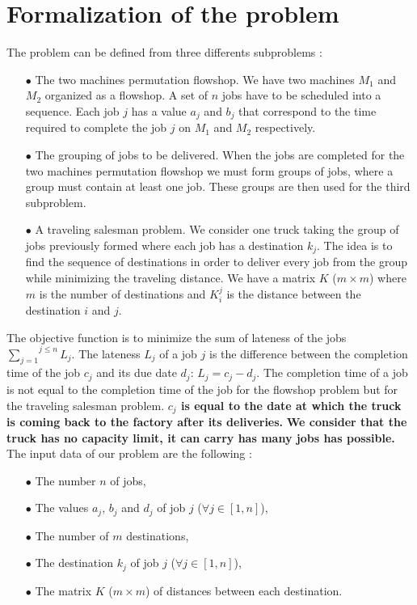 \documentclass[UTF8, twoside]{EPURapport}
\begin{document}
\chapter{Formalization of the problem}

	The problem can be defined from three differents subproblems :
	
\begin{itemize}
\item[$\bullet$] The two machines permutation flowshop. We have two machines $M_1$ and $M_2$ organized as a flowshop. A set of $n$ jobs have to be scheduled into a sequence. Each job $j$ has a value $a_j$ and $b_j$ that correspond to the time required to complete the job $j$ on $M_1$ and $M_2$ respectively.
\item[$\bullet$] The grouping of jobs to be delivered. When the jobs are completed for the two machines permutation flowshop we must form groups of jobs, where a group must contain at least one job. These groups are then used for the third subproblem.
\item[$\bullet$] A traveling salesman problem. We consider one truck taking the group of jobs previously formed where each job has a destination $k_j$. The idea is to find the sequence of destinations in order to deliver every job from the group while minimizing the traveling distance. We have a matrix $K$ ($m \times m$) where $m$ is the number of destinations and $K_i^j$ is the distance between the destination $i$ and $j$.
\end{itemize}

	The objective function is to minimize the sum of lateness of the jobs $\overset{j \leq n}{\underset{j=1}{\sum}} L_j$. The lateness $L_j$  of a job $j$ is the difference between the completion time of the job $c_j$ and its due date $d_j$: $L_j = c_j - d_j$. The completion time of a job is not equal to the completion time of the job for the flowshop problem but for the traveling salesman problem. \textbf{$c_j$ is equal to the date at which the truck is coming back to the factory after its deliveries.}
\textbf{We consider that the truck has no capacity limit, it can carry has many jobs has possible.}
\\

	The input data of our problem are the following :
\begin{itemize}
\item[$\bullet$] The number $n$ of jobs,
\item[$\bullet$] The values $a_j$, $b_j$ and $d_j$ of job $j$ ($\forall j \in [1,n]$),
\item[$\bullet$] The number of $m$ destinations,
\item[$\bullet$] The destination $k_j$ of job $j$ ($\forall j \in [1,n]$),
\item[$\bullet$] The matrix $K$ ($m \times m$) of distances between each destination.\\
\end{itemize}
\end{document}
